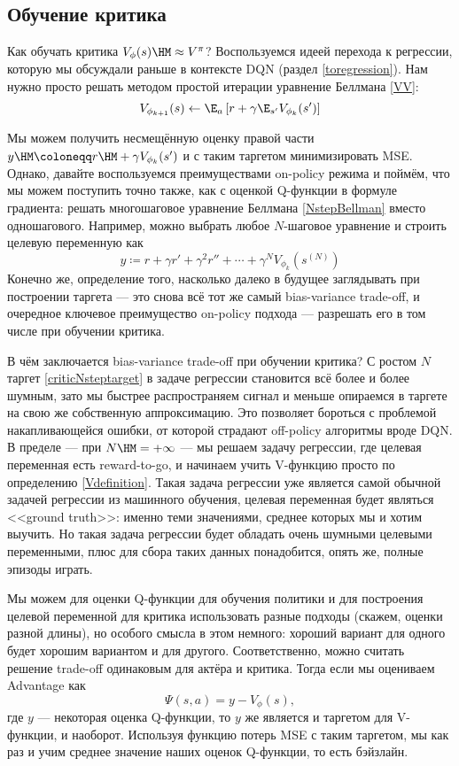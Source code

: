 \subsection{Обучение критика}

Как обучать критика $V_{\phi}(s) \HM\approx V^\pi$? Воспользуемся идеей перехода к регрессии, которую мы обсуждали раньше в контексте DQN (раздел \ref{toregression}). Нам нужно просто решать методом простой итерации уравнение Беллмана \eqref{VV}:
$$V_{\phi_{k+1}}(s) \leftarrow \E_{a} \left[ r + \gamma \E_{s'} V_{\phi_k}(s') \right]$$

Мы можем получить несмещённую оценку правой части $y \HM \coloneqq r \HM+ \gamma V_{\phi_k}(s')$ и с таким таргетом минимизировать MSE. Однако, давайте воспользуемся преимуществами on-policy режима и поймём, что мы можем поступить точно также, как с оценкой Q-функции в формуле градиента: решать многошаговое уравнение Беллмана \eqref{NstepBellman} вместо одношагового. Например, можно выбрать любое $N$-шаговое уравнение и строить целевую переменную как
\begin{equation}\label{criticNsteptarget}
y \coloneqq r + \gamma r' + \gamma^2 r'' + \cdots + \gamma^N V_{\phi_k}(s^{(N)})
\end{equation}
Конечно же, определение того, насколько далеко в будущее заглядывать при построении таргета --- это снова всё тот же самый bias-variance trade-off, и очередное ключевое преимущество on-policy подхода --- разрешать его в том числе при обучении критика.

В чём заключается bias-variance trade-off при обучении критика? С ростом $N$ таргет \eqref{criticNsteptarget} в задаче регрессии становится всё более и более шумным, зато мы быстрее распространяем сигнал и меньше опираемся в таргете на свою же собственную аппроксимацию. Это позволяет бороться с проблемой накапливающейся ошибки, от которой страдают off-policy алгоритмы вроде DQN. В пределе --- при $N \HM= +\infty$ --- мы решаем задачу регрессии, где целевая переменная есть reward-to-go, и начинаем учить V-функцию просто по определению \eqref{Vdefinition}. Такая задача регрессии уже является самой обычной задачей регрессии из машинного обучения, целевая переменная будет являться <<ground truth>>: именно теми значениями, среднее которых мы и хотим выучить. Но такая задача регрессии будет обладать очень шумными целевыми переменными, плюс для сбора таких данных понадобится, опять же, полные эпизоды играть.

Мы можем для оценки Q-функции для обучения политики и для построения целевой переменной для критика использовать разные подходы (скажем, оценки разной длины), но особого смысла в этом немного: хороший вариант для одного будет хорошим вариантом и для другого. Соответственно, можно считать решение trade-off одинаковым для актёра и критика. Тогда если мы оцениваем Advantage как
$$\Psi(s, a) = y - V_{\phi}(s),$$
где $y$ --- некоторая оценка Q-функции, то $y$ же является и таргетом для V-функции, и наоборот. Используя функцию потерь MSE с таким таргетом, мы как раз и учим среднее значение наших оценок Q-функции, то есть бэйзлайн.

